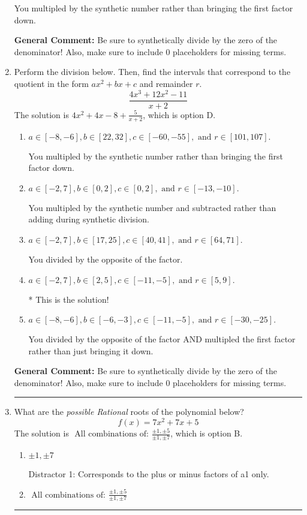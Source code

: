 \documentclass{extbook}[14pt]
\newcommand{\litem}[1]{\item #1

\rule{\textwidth}{0.4pt}}
\begin{document}
\begin{enumerate}
{\begin{enumerate}[label=\Alph*.]
 You multipled by the synthetic number rather than bringing the first factor down.
\end{enumerate}

\textbf{General Comment:} Be sure to synthetically divide by the zero of the denominator! Also, make sure to include 0 placeholders for missing terms.
}
\litem{
Perform the division below. Then, find the intervals that correspond to the quotient in the form $ax^2+bx+c$ and remainder $r$.
\[ \frac{4x^{3} +12 x^{2} -11}{x + 2} \]The solution is \( 4x^{2} +4 x -8 + \frac{5}{x + 2} \), which is option D.\begin{enumerate}[label=\Alph*.]
\item \( a \in [-8, -6], b \in [22, 32], c \in [-60, -55], \text{ and } r \in [101, 107]. \)

 You multipled by the synthetic number rather than bringing the first factor down.
\item \( a \in [-2, 7], b \in [0, 2], c \in [0, 2], \text{ and } r \in [-13, -10]. \)

 You multipled by the synthetic number and subtracted rather than adding during synthetic division.
\item \( a \in [-2, 7], b \in [17, 25], c \in [40, 41], \text{ and } r \in [64, 71]. \)

 You divided by the opposite of the factor.
\item \( a \in [-2, 7], b \in [2, 5], c \in [-11, -5], \text{ and } r \in [5, 9]. \)

* This is the solution!
\item \( a \in [-8, -6], b \in [-6, -3], c \in [-11, -5], \text{ and } r \in [-30, -25]. \)

 You divided by the opposite of the factor AND multipled the first factor rather than just bringing it down.
\end{enumerate}

\textbf{General Comment:} Be sure to synthetically divide by the zero of the denominator! Also, make sure to include 0 placeholders for missing terms.
}
\litem{
What are the \textit{possible Rational} roots of the polynomial below?
\[ f(x) = 7x^{2} +7 x + 5 \]The solution is \( \text{ All combinations of: }\frac{\pm 1,\pm 5}{\pm 1,\pm 7} \), which is option B.\begin{enumerate}[label=\Alph*.]
\item \( \pm 1,\pm 7 \)

 Distractor 1: Corresponds to the plus or minus factors of a1 only.
\item \( \text{ All combinations of: }\frac{\pm 1,\pm 5}{\pm 1,\pm 7} \)


\end{enumerate}}
\end{enumerate}
\end{document}
